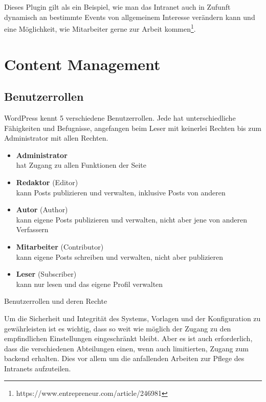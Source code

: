 \documentclass[a4paper,11pt,twoside,titlepage,openright]{report}
\numberwithin{equation}{section}		%
\numberwithin{figure}{section}			%
\numberwithin{table}{section}				%
\begin{document}
Dieses Plugin gilt als ein Beispiel, wie man das Intranet auch in Zufunft dynamisch an bestimmte Events von allgemeinem Interesse verändern kann und eine Möglichkeit, wie Mitarbeiter gerne zur Arbeit kommen\footnote{https://www.entrepreneur.com/article/246981}.

\chapter{Content Management}
\section{Benutzerrollen}

WordPress kennt 5 verschiedene Benutzerrollen. Jede hat unterschiedliche Fähigkeiten und Befugnisse, angefangen beim Leser mit keinerlei Rechten bis zum Administrator mit allen Rechten.

\begin{table}[H]
\centering
\begin{itemize}
\item \textbf{Administrator}\\ hat Zugang zu allen Funktionen der Seite
\item \textbf{Redaktor} (Editor)\\ kann Posts publizieren und verwalten, inklusive Posts von anderen
\item \textbf{Autor} (Author)\\ kann eigene Posts publizieren und verwalten, nicht aber jene von anderen Verfassern
\item \textbf{Mitarbeiter} (Contributor)\\ kann eigene Posts schreiben und verwalten, nicht aber publizieren
\item \textbf{Leser} (Subscriber)\\ kann nur lesen und das eigene Profil verwalten
\end{itemize}

\caption{Benutzerrollen und deren Rechte}
\end{table}

Um die Sicherheit und Integrität des Systems, Vorlagen und der Konfiguration zu gewährleisten ist es wichtig, dass so weit wie möglich der Zugang zu den empfindlichen Einstellungen eingeschränkt bleibt. Aber es ist auch erforderlich, dass die verschiedenen Abteilungen einen, wenn auch limitierten, Zugang zum \gls{backend} erhalten. Dies vor allem um die anfallenden Arbeiten zur Pflege des Intranets aufzuteilen.
\end{document}
